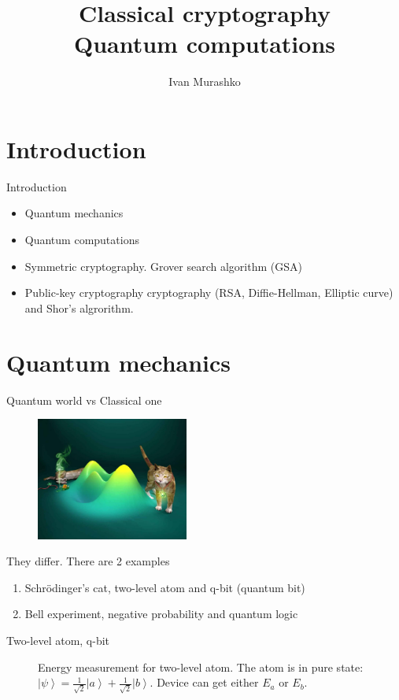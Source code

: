 \documentclass[10pt,pdf,hyperref={unicode}]{beamer}
\title[Cryptography and quantum computations]{Classical
  cryptography\\Quantum computations}
\author{Ivan Murashko}
\date{}
\begin{document}
\begin{frame}
\titlepage
\end{frame}


\section{Introduction}

\begin{frame}{Introduction}
\begin{itemize}
\item Quantum mechanics
\item Quantum computations
\item Symmetric cryptography. Grover search algorithm (GSA)
\item Public-key cryptography cryptography (RSA, Diffie-Hellman, Elliptic
curve) and Shor's algrorithm.
\end{itemize}
\end{frame}

\section{Quantum mechanics}

\begin{frame}{Quantum world vs Classical one}
   \begin{figure} 
   \includegraphics[width=50mm,scale=0.5]{quantumworld.jpg}
  \end{figure}
  They differ. There are 2 examples
  \begin{enumerate}
  \item Schrödinger's cat, two-level atom and q-bit (quantum bit)
  \item Bell experiment, negative probability and quantum logic  
  \end{enumerate}
\end{frame}

\begin{frame}{Two-level atom, q-bit}
\begin{figure}
\centering



\caption{Energy measurement for two-level atom. The atom is in pure
  state:  $\left|\psi\right> = 
  \frac{1}{\sqrt{2}}\left|a\right> + \frac{1}{\sqrt{2}}\left|b\right>$.
  Device can get either $E_a$ or $E_b$.
}
\label{fig:add:mesure_ex}
\end{figure}
\end{frame}
\end{document}
